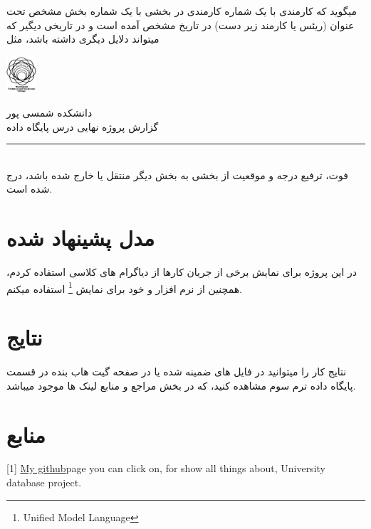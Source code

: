 \documentclass{article}
\begin{document}
میگوید که کارمندی با یک شماره کارمندی در بخشی با یک شماره بخش مشخص تحت عنوان
(ریئس یا کارمند زیر دست)
در تاریخ مشخص آمده است و در تاریخی دیگیر که میتواند دلایل دیگری داشته باشد، مثل
\\
\hfill \break 
\begin{minipage}{0.1\textwidth}%
  \includegraphics[width=1.1cm]{tvu.png}
  \end{minipage}%
  \hfill%
  \begin{minipage}{0.9\textwidth}\raggedleft
  دانشکده شمسی پور\\
  گزارش پروژه نهایی درس پایگاه داده\\
  \end{minipage}

\par\noindent\rule{\textwidth}{3pt}\\

فوت، ترفیع درجه و موقعیت از بخشی به بخش دیگر منتقل یا خارج شده باشد، درج شده است.






\section{مدل پشینهاد شده}
در این پروژه برای نمایش برخی از جریان کارها از دیاگرام های کلاسی استفاده کردم، 
همچنین از نرم افزار
و خود
برای نمایش 
\footnote{Unified Model Language}
استفاده میکنم.

\section{نتایج}
نتایج کار را میتوانید در فایل های ضمینه شده یا در صفحه گیت هاب بنده در قسمت پایگاه داده ترم سوم مشاهده کنید، که در بخش مراجع و منابع لینک ها موجود میباشد.



\newpage
\section*{منابع}

\medskip

\small
\LTR 
\latin

[1] \href{https://github.com/Asncodes-80/handouting_hws/tree/main/Database%26az/Term3/prictice/universityProject}{My github}page you can click on, for show all things about, University database project.
\end{document}
